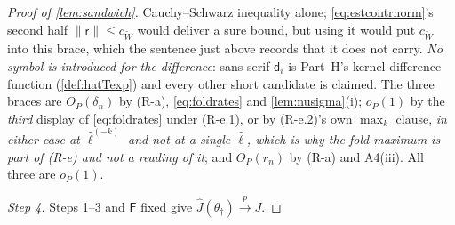 \begin{proof}[Proof of \cref{lem:sandwich}]
Cauchy--Schwarz inequality alone; \eqref{eq:estcontrnorm}'s second half
$\|\mathsf r\|\le c_{\widetilde W}$ would deliver a sure bound, but using it would put $c_{\widetilde W}$
into this brace, which the sentence just above records that it does not carry.
\emph{No symbol is introduced for the difference}: sans-serif $\mathsf d_i$ is Part~H's kernel-difference
function (\cref{def:hatTexp}) and every other short candidate is claimed. The three braces are
$O_P(\delta_n)$ by (R-a), \eqref{eq:foldrates} and \cref{lem:nusigma}(i); $o_P(1)$ by the \emph{third}
display of \eqref{eq:foldrates} under (R-e.1), or by (R-e.2)'s own $\max_k$ clause, \emph{in either case
at $\hat\ell^{(-k)}$ and not at a single $\hat\ell$, which is why the fold maximum is part of (R-e) and not
a reading of it}; and $O_P(r_n)$ by (R-a) and A4(iii). All three are $o_P(1)$.

\emph{Step 4.} Steps 1--3 and $\mathsf F$ fixed give $\hat J(\theta_\dagger)\xrightarrow{p}J$.


\end{proof}
